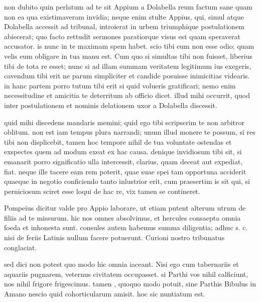 


 non dubito quin perlatum ad te sit Appium a Dolabella reum factum sane quam non ea qua existimaveram invidia; neque enim stulte Appius, qui, simul atque Dolabella accessit ad tribunal, introierat in urbem triumphique postulationem abiecerat; quo facto rettudit sermones paratiorque visus est quam speraverat accusator. is nunc in te maximam spem habet. scio tibi eum non esse odio; quam velis eum obligare in tua manu est. Cum quo si simultas tibi non fuisset, liberius tibi de tota re esset; nunc si ad illam summam veritatem legitimum ius exegeris, cavendum tibi erit ne parum simpliciter et candide posuisse inimicitias videaris. in hanc partem porro tutum tibi erit si quid volueris gratificari; nemo enim necessitudine et amicitia te deterritum ab officio dicet. illud mihi occurrit, quod inter postulationem et nominis delationem uxor a Dolabella discessit.

 quid mihi discedens mandaris memini; quid ego tibi scripserim te non arbitror oblitum. non est iam tempus plura narrandi; unum illud monere te possum, si res tibi non displicebit, tamen hoc tempore nihil de tua voluntate ostendas et exspectes quem ad modum exeat ex hac causa. denique invidiosum tibi sit, si emanarit porro significatio ulla intercessit, clarius, quam deceat aut expediat, fiat. neque ille tacere eam rem poterit, quae suae spei tam opportuna acciderit quaeque in negotio conficiendo tanto inlustrior erit, cum praesertim is sit qui, si perniciosum sciret esse loqui de hac re, vix tamen se contineret.

 Pompeius dicitur valde pro Appio laborare, ut etiam putent alterum utrum de filiis ad te missurum. hic nos omnes absolvimus, et hercules consaepta omnia foeda et inhonesta sunt. consules autem habemus summa diligentia; adhuc s. c. nisi de feriis Latinis nullum facere potuerunt. Curioni nostro tribunatus conglaciat.

 sed dici non potest quo modo hic omnia iaceant. Nisi ego cum tabernariis et aquariis pugnarem, veternus civitatem occupasset. si Parthi vos nihil calficiunt, nos nihil frigore frigescimus. tamen , quoquo modo potuit, sine Parthis Bibulus in Amano nescio quid cohorticularum amisit. hoc sic nuntiatum est.

